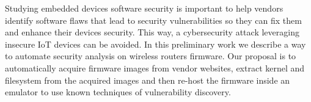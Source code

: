 Studying embedded devices software security is important to help vendors identify software flaws that lead to security vulnerabilities so they can fix them and enhance their devices security. This way, a cybersecurity attack leveraging insecure IoT devices can be avoided. In this preliminary work we describe a way to automate security analysis on wireless routers firmware. Our proposal is to automatically acquire firmware images from vendor websites, extract kernel and filesystem from the acquired images and then re-host the firmware inside an emulator to use known techniques of vulnerability discovery.